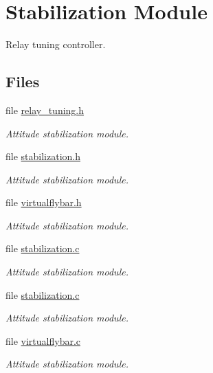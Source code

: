 \hypertarget{group___stabilization_module}{\section{Stabilization Module}
\label{group___stabilization_module}
}


Relay tuning controller.  


\subsection*{Files}
\begin{DoxyCompactItemize}
\item 
file \hyperlink{relay__tuning_8h}{relay\-\_\-tuning.\-h}
\begin{DoxyCompactList}\small\item\em Attitude stabilization module. \end{DoxyCompactList}\item 
file \hyperlink{stabilization_8h}{stabilization.\-h}
\begin{DoxyCompactList}\small\item\em Attitude stabilization module. \end{DoxyCompactList}\item 
file \hyperlink{virtualflybar_8h}{virtualflybar.\-h}
\begin{DoxyCompactList}\small\item\em Attitude stabilization module. \end{DoxyCompactList}\item 
file \hyperlink{stabilization_8c}{stabilization.\-c}
\begin{DoxyCompactList}\small\item\em Attitude stabilization module. \end{DoxyCompactList}\item 
file \hyperlink{stabilization_8c}{stabilization.\-c}
\begin{DoxyCompactList}\small\item\em Attitude stabilization module. \end{DoxyCompactList}\item 
file \hyperlink{virtualflybar_8c}{virtualflybar.\-c}
\begin{DoxyCompactList}\small\item\em Attitude stabilization module. \end{DoxyCompactList}\end{DoxyCompactItemize}

